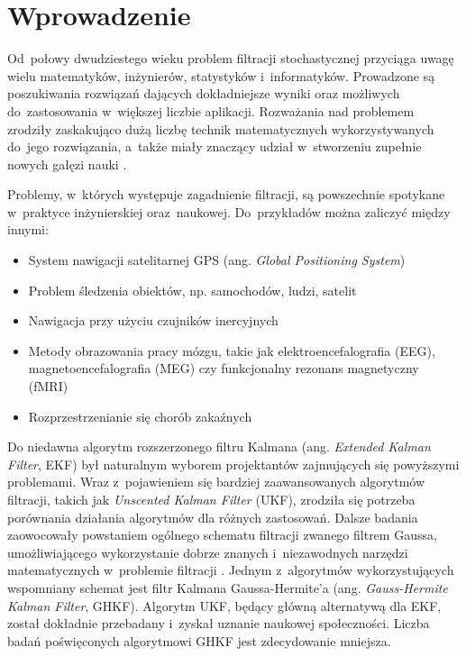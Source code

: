 \chapter{Wprowadzenie}
\label{cha:introduction}
Od~połowy dwudziestego wieku problem filtracji stochastycznej przyciąga uwagę wielu matematyków, inżynierów, statystyków i~informatyków. Prowadzone są poszukiwania rozwiązań dających dokładniejsze wyniki oraz możliwych do~zastosowania w~większej liczbie aplikacji. Rozważania nad problemem zrodziły zaskakująco dużą liczbę technik matematycznych wykorzystywanych do~jego rozwiązania, a~także miały znaczący udział w~stworzeniu zupełnie nowych gałęzi nauki \cite{Crisan}. \par
Problemy, w~których występuje zagadnienie filtracji, są powszechnie spotykane w~praktyce inżynierskiej oraz~naukowej. Do~przykładów można zaliczyć między innymi: \cite[2]{Sarka}
\begin{itemize}
	\item System nawigacji satelitarnej GPS (ang. \textit{Global Positioning System})
	\item Problem śledzenia obiektów, np. samochodów, ludzi, satelit
	\item Nawigacja przy użyciu czujników inercyjnych
	\item Metody obrazowania pracy mózgu, takie jak elektroencefalografia (EEG), magnetoencefalografia (MEG) czy funkcjonalny rezonans magnetyczny (fMRI)
	\item Rozprzestrzenianie się chorób zakaźnych
	
\end{itemize} \par
Do niedawna algorytm rozszerzonego filtru Kalmana (ang. \textit{Extended Kalman Filter}, EKF) był naturalnym wyborem projektantów zajmujących się powyższymi problemami. Wraz z~pojawieniem się bardziej zaawansowanych algorytmów filtracji, takich jak \textit{Unscented Kalman Filter} (UKF), zrodziła się potrzeba porównania działania algorytmów dla różnych zastosowań. Dalsze badania zaowocowały powstaniem ogólnego schematu filtracji zwanego filtrem Gaussa, umożliwiającego wykorzystanie dobrze znanych i~niezawodnych narzędzi matematycznych w~problemie filtracji \cite{Ito}. Jednym z~algorytmów wykorzystujących wspomniany schemat jest filtr Kalmana Gaussa-Hermite'a (ang. \textit{Gauss-Hermite Kalman Filter}, GHKF). Algorytm UKF, będący główną alternatywą dla EKF, został dokładnie przebadany i~zyskał uznanie naukowej społeczności. Liczba badań poświęconych algorytmowi GHKF jest zdecydowanie mniejsza.\\ \\

